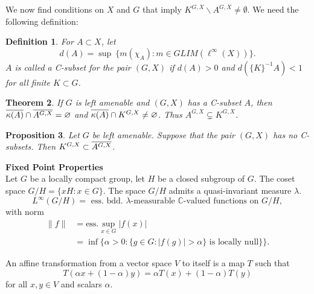\documentclass[landscape]{slides}
\newtheorem{defn}{Definition}
\newtheorem{theorem}[defn]{Theorem}
\newtheorem{proposition}[defn]{Proposition}
\newtheorem{lemma}[defn]{Lemma}
\begin{document}
\begin{slide}
We now find conditions on $X$ and $G$ that imply $K^{G,X}\backslash A^{G,X} \neq \emptyset$.
We need the following definition:\\

\begin{defn}
For $A \subset X$, let
\[
d(A) = \sup\:\{ m(\chi_A) : m\in GLIM(\ell^\infty(X)) \}.
\]
$A$ is called a {\it C-subset} for the pair  $(G,X)$ if $d(A) > 0$ and $d(\{K\}^{-1}A) < 1$ for all
finite $K\subset G$.\\
\end{defn}




\begin{theorem}
If $G$ is left amenable and $(G,X)$ has a C-subset $A$, then $\overline{\kappa(A)}\cap\overline{A^{G,X}} = \varnothing$ and
$\overline{\kappa(A)}\cap K^{G,X} \neq \varnothing$.  Thus $A^{G,X} \subsetneq K^{G,X}$.\\
\end{theorem}

\begin{proposition}
Let $G$ be left amenable.  Suppose that the pair $(G,X)$ has no C-subsets.
Then $K^{G,X} \subset \overline{A^{G,X}}$.
\end{proposition}
\end{slide}

\begin{slide}
{\large \bf{Fixed Point Properties}}\\
Let $G$ be a locally compact group, let $H$ be a closed subgroup of $G$.
The coset space $G/H = \{xH: x\in G\}$.  The space $G/H$ admits a
quasi-invariant measure $\lambda$.
\[
L^\infty(G/H) = \text{ ess. bdd. $\lambda$-measurable $\mathbb{C}$-valued functions on }G/H,
\]
with norm
\begin{align*}
\|f\| &= \text{ess.}\sup_{x\in G} |f(x)|\\
&= \inf\{\alpha>0:\{g\in G:|f(g)| > \alpha\}\text{ is locally null}\}\}.
\end{align*}


An affine transformation from a vector space $V$ to itself is a map $T$
such that
\[
T(\alpha x + (1-\alpha)y) = \alpha T(x) + (1-\alpha)T(y)
\]
for all $x,y\in V$ and scalars $\alpha$.
\end{slide}
\end{document}

